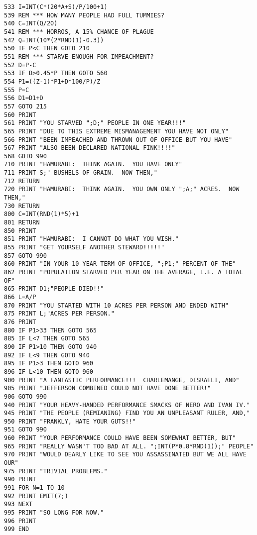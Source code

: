 \begin{lstlisting}
533 I=INT(C*(20*A+S)/P/100+1)
539 REM *** HOW MANY PEOPLE HAD FULL TUMMIES?
540 C=INT(Q/20)
541 REM *** HORROS, A 15% CHANCE OF PLAGUE
542 Q=INT(10*(2*RND(1)-0.3))
550 IF P<C THEN GOTO 210
551 REM *** STARVE ENOUGH FOR IMPEACHMENT?
552 D=P-C
553 IF D>0.45*P THEN GOTO 560
554 P1=((Z-1)*P1+D*100/P)/Z
555 P=C
556 D1=D1+D
557 GOTO 215
560 PRINT
561 PRINT "YOU STARVED ";D;" PEOPLE IN ONE YEAR!!!"
565 PRINT "DUE TO THIS EXTREME MISMANAGEMENT YOU HAVE NOT ONLY"
566 PRINT "BEEN IMPEACHED AND THROWN OUT OF OFFICE BUT YOU HAVE"
567 PRINT "ALSO BEEN DECLARED NATIONAL FINK!!!!"
568 GOTO 990
710 PRINT "HAMURABI:  THINK AGAIN.  YOU HAVE ONLY"
711 PRINT S;" BUSHELS OF GRAIN.  NOW THEN,"
712 RETURN
720 PRINT "HAMURABI:  THINK AGAIN.  YOU OWN ONLY ";A;" ACRES.  NOW THEN,"
730 RETURN
800 C=INT(RND(1)*5)+1
801 RETURN
850 PRINT
851 PRINT "HAMURABI:  I CANNOT DO WHAT YOU WISH."
855 PRINT "GET YOURSELF ANOTHER STEWARD!!!!!"
857 GOTO 990
860 PRINT "IN YOUR 10-YEAR TERM OF OFFICE, ";P1;" PERCENT OF THE"
862 PRINT "POPULATION STARVED PER YEAR ON THE AVERAGE, I.E. A TOTAL OF"
865 PRINT D1;"PEOPLE DIED!!"
866 L=A/P
870 PRINT "YOU STARTED WITH 10 ACRES PER PERSON AND ENDED WITH"
875 PRINT L;"ACRES PER PERSON."
876 PRINT
880 IF P1>33 THEN GOTO 565
885 IF L<7 THEN GOTO 565
890 IF P1>10 THEN GOTO 940
892 IF L<9 THEN GOTO 940
895 IF P1>3 THEN GOTO 960
896 IF L<10 THEN GOTO 960
900 PRINT "A FANTASTIC PERFORMANCE!!!  CHARLEMANGE, DISRAELI, AND"
905 PRINT "JEFFERSON COMBINED COULD NOT HAVE DONE BETTER!"
906 GOTO 990
940 PRINT "YOUR HEAVY-HANDED PERFORMANCE SMACKS OF NERO AND IVAN IV."
945 PRINT "THE PEOPLE (REMIANING) FIND YOU AN UNPLEASANT RULER, AND,"
950 PRINT "FRANKLY, HATE YOUR GUTS!!"
951 GOTO 990
960 PRINT "YOUR PERFORMANCE COULD HAVE BEEN SOMEWHAT BETTER, BUT"
965 PRINT "REALLY WASN'T TOO BAD AT ALL. ";INT(P*0.8*RND(1));" PEOPLE"
970 PRINT "WOULD DEARLY LIKE TO SEE YOU ASSASSINATED BUT WE ALL HAVE OUR"
975 PRINT "TRIVIAL PROBLEMS."
990 PRINT
991 FOR N=1 TO 10
992 PRINT EMIT(7;)
993 NEXT
995 PRINT "SO LONG FOR NOW."
996 PRINT
999 END
\end{lstlisting}
